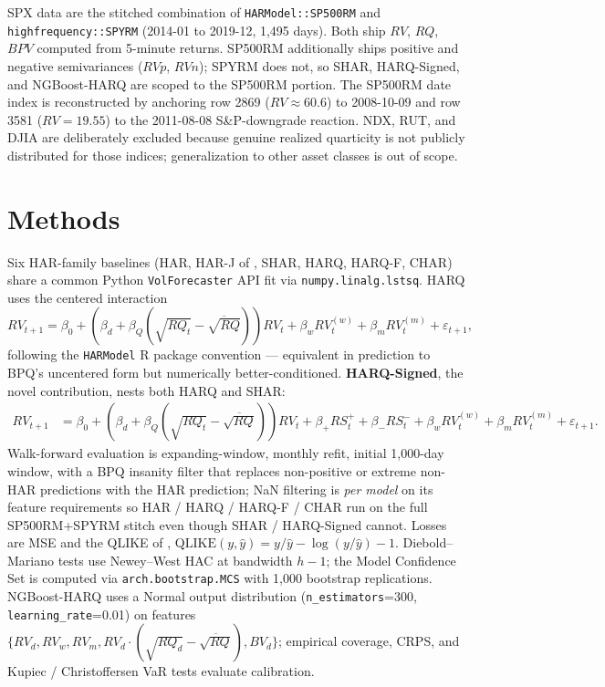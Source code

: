 \documentclass[10pt,letterpaper]{article}
\begin{document}
SPX data are the stitched combination of \texttt{HARModel::SP500RM} \citep[][4{,}096 trading days, 1997-05 to 2013-08]{sjoerup2019} and \texttt{highfrequency::SPYRM} (2014-01 to 2019-12, 1{,}495 days). Both ship $RV$, $RQ$, $BPV$ computed from 5-minute returns. SP500RM additionally ships positive and negative semivariances ($RVp$, $RVn$); SPYRM does not, so SHAR, HARQ-Signed, and NGBoost-HARQ are scoped to the SP500RM portion. The SP500RM date index is reconstructed by anchoring row 2869 ($RV \approx 60.6$) to 2008-10-09 and row 3581 ($RV = 19.55$) to the 2011-08-08 S\&P-downgrade reaction. NDX, RUT, and DJIA are deliberately excluded because genuine realized quarticity is not publicly distributed for those indices; generalization to other asset classes is out of scope.

\section{Methods}
Six HAR-family baselines (HAR, HAR-J of \citealp{abd2007}, SHAR, HARQ, HARQ-F, CHAR) share a common Python \texttt{VolForecaster} API fit via \texttt{numpy.linalg.lstsq}. HARQ uses the centered interaction
\begin{equation}
RV_{t+1} = \beta_0 + \left(\beta_d + \beta_Q\!\left(\sqrt{RQ_t} - \overline{\sqrt{RQ}}\right)\right) RV_t + \beta_w RV_t^{(w)} + \beta_m RV_t^{(m)} + \varepsilon_{t+1},
\end{equation}
following the \texttt{HARModel} R package convention --- equivalent in prediction to BPQ's uncentered form but numerically better-conditioned. \textbf{HARQ-Signed}, the novel contribution, nests both HARQ and SHAR:
\begin{align}
RV_{t+1} &= \beta_0 + \left(\beta_d + \beta_Q\!\left(\sqrt{RQ_t} - \overline{\sqrt{RQ}}\right)\right) RV_t + \beta_+ RS^+_t + \beta_- RS^-_t + \beta_w RV_t^{(w)} + \beta_m RV_t^{(m)} + \varepsilon_{t+1}.
\end{align}
Walk-forward evaluation is expanding-window, monthly refit, initial 1{,}000-day window, with a BPQ insanity filter that replaces non-positive or extreme non-HAR predictions with the HAR prediction; NaN filtering is \emph{per model} on its feature requirements so HAR / HARQ / HARQ-F / CHAR run on the full SP500RM+SPYRM stitch even though SHAR / HARQ-Signed cannot. Losses are MSE and the QLIKE of \citet{patton2011}, $\mathrm{QLIKE}(y, \hat{y}) = y/\hat{y} - \log(y/\hat{y}) - 1$. Diebold--Mariano tests use Newey--West HAC at bandwidth $h-1$; the Model Confidence Set \citep{hln2011} is computed via \texttt{arch.bootstrap.MCS} with 1{,}000 bootstrap replications. NGBoost-HARQ \citep{ngboost2020} uses a Normal output distribution (\texttt{n\_estimators}=300, \texttt{learning\_rate}=0.01) on features $\{RV_d, RV_w, RV_m, RV_d \cdot (\sqrt{RQ_d}-\overline{\sqrt{RQ}}), BV_d\}$; empirical coverage, CRPS, and Kupiec / Christoffersen VaR tests \citep{kupiec1995,christoffersen1998} evaluate calibration.
\end{document}
